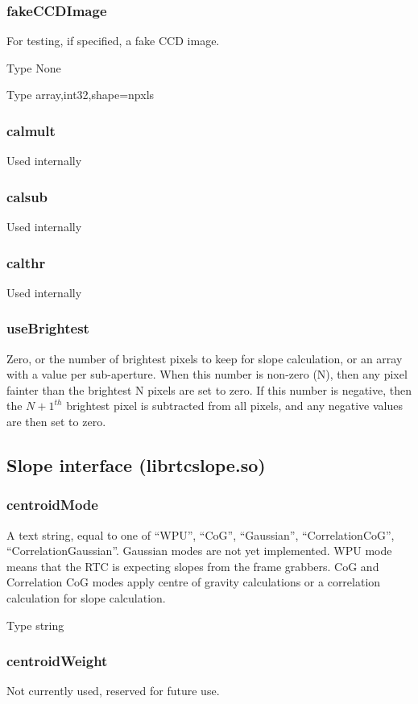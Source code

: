 \documentclass[a4,10pt]{article}
\begin{document}
\subsubsection{fakeCCDImage}
For testing, if specified, a fake CCD image.

Type None

Type array,int32,shape=npxls

\subsubsection{calmult}
Used internally
\subsubsection{calsub}
Used internally
\subsubsection{calthr}
Used internally

\subsubsection{useBrightest}
Zero, or the number of brightest pixels to keep for slope calculation,
or an array with a value per sub-aperture.  When this number is
non-zero (N), then any pixel fainter than the brightest N pixels are
set to zero.  If this number is negative, then the $N+1^{th}$
brightest pixel is subtracted from all pixels, and any negative values
are then set to zero.

\subsection{Slope interface (librtcslope.so)}
\subsubsection{centroidMode}
A text string, equal to one of ``WPU'', ``CoG'', ``Gaussian'',
``CorrelationCoG'', ``CorrelationGaussian''.  Gaussian modes are not
yet implemented.  WPU mode means that the RTC is expecting slopes from
the frame grabbers.  CoG and Correlation CoG modes apply centre of
gravity calculations or a correlation calculation for slope
calculation.

Type string

\subsubsection{centroidWeight}
Not currently used, reserved for future use.
\end{document}

